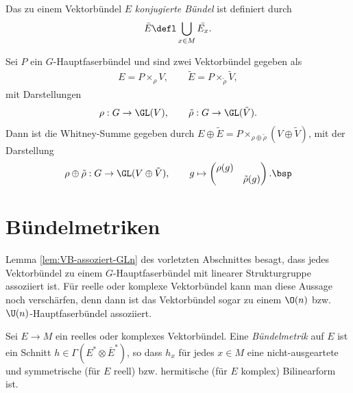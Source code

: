 \documentclass[%
	paper=a5,%
	fleqn,%
	DIV=18,%
	BCOR=0mm,
	fontsize=11pt,
	titlepage=false,%
	bibliography=totoc,
	DIV=18,%
	twoside=true,
	pdftitle=Riemannsche Geometrie,
	pdfauthor=Uwe Semmelmann,
	numbers=noendperiod]%
	{scrbook}
\begin{document}
\begin{defn}
Das zu einem Vektorbündel $E$ \emph{konjugierte Bündel} ist definiert durch
\begin{align*}
\bar{E}\defl\bigcup_{x\in M} \bar{E_x}. 
\end{align*}
\end{defn}


\begin{ex}
Sei $P$ ein $G$-Hauptfaserbündel und sind zwei Vektorbündel gegeben als
\begin{align*}
E = P\times_\rho V,\qquad \tilde{E} = P \times_{\tilde{\rho}} \tilde V,
\end{align*}
mit Darstellungen
\begin{align*}
\rho : G\to \GL(V),\qquad \tilde{\rho}: G\to \GL(\tilde V).
\end{align*}
Dann ist die Whitney-Summe gegeben durch $E\oplus \tilde{E} =
P\times_{\rho\oplus \tilde{\rho}} (V\oplus \tilde V)$, mit der Darstellung
\begin{align*}
\rho\oplus\tilde{\rho} : G\to \GL(V\oplus \tilde V),\qquad 
g\mapsto 
\begin{pmatrix}
\rho(g)\\
& \tilde{\rho}(g)
\end{pmatrix}.\bsp
\end{align*}
\end{ex}


\section{Bündelmetriken}

Lemma \ref{lem:VB-assoziert-GLn} des vorletzten Abschnittes besagt, dass jedes
Vektorbündel zu einem $G$-Hauptfaserbündel mit linearer Strukturgruppe
assoziiert ist. Für reelle oder komplexe Vektorbündel kann man diese Aussage
noch verschärfen, denn dann ist das Vektorbündel sogar zu einem $\O(n)$ bzw.
$\U(n)$-Hauptfaserbündel assoziiert.

\begin{defn}
Sei $E\to M$ ein reelles oder komplexes Vektorbündel. Eine
\emph{Bündelmetrik} auf $E$ ist ein Schnitt $h\in\Gamma(E^*\otimes \bar{E}^*)$,
so dass $h_x$ für jedes $x\in M$ eine nicht-ausgeartete und symmetrische (für
$E$ reell) bzw. hermitische (für $E$ komplex) Bilinearform ist.\fish
\end{defn}
\end{document}
